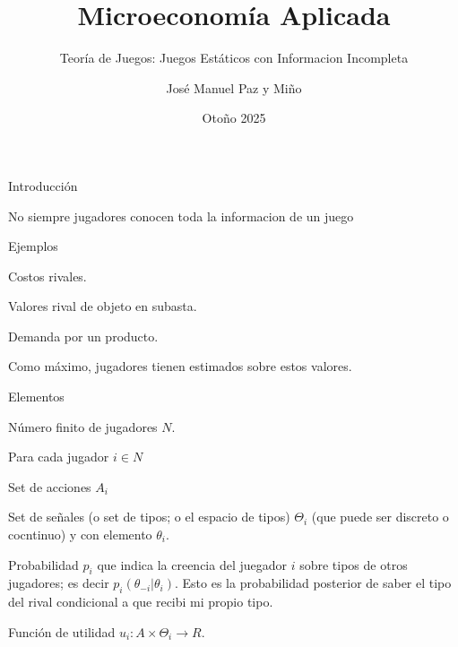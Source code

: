 \documentclass[notes, 11pt]{beamer} %
\newenvironment{wideitemize}{\itemize\addtolength{\itemsep}{10pt}}{\enditemize}
\begin{document}
\title{Microeconom\'ia Aplicada}   
\subtitle{Teor\'ia de Juegos: Juegos Est\'aticos con Informacion Incompleta}   
\author[Paz y Mino ]{Jos\'e Manuel Paz y Mi\~no}
\date{Oto\~no 2025} 

\frame{\titlepage} 

\begin{frame}{Introducci\'on}
	\begin{wideitemize}
		\item<1-> No siempre jugadores conocen toda la informacion de un juego
		\item<2-> Ejemplos
		\begin{wideitemize}
			\item<3->[--] Costos rivales.
			\item<4->[--] Valores rival de objeto en subasta.
			\item<5->[--] Demanda por un producto.
		\end{wideitemize}
		\item<6-> Como m\'aximo, jugadores tienen estimados sobre estos valores.

	\end{wideitemize}
\end{frame}


\begin{frame}{Elementos}
	\begin{wideitemize}
		\item<1-> N\'umero finito de jugadores $N$.
		\item<2-> Para cada jugador $i \in N$
		\begin{wideitemize}
			\item<3->[--] Set de acciones $A_{i}$
			\item<4->[--] Set de se\~nales (o set de tipos; o el espacio de tipos) $\Theta_{i}$ (que puede ser discreto o cocntinuo) y con elemento $\theta_i$.
			\item<5->[--] Probabilidad $p_{i}$ que indica la creencia del juegador $i$ sobre tipos de otros jugadores; es decir $p_{i}(\theta_{-i}|\theta_{i})$. Esto es la probabilidad posterior de saber el tipo del rival condicional a que recibi mi propio tipo.
			\item<6->[--] Funci\'on de utilidad $u_{i}: A \times \Theta_{i} \rightarrow R$.
		\end{wideitemize}
	\end{wideitemize}
\end{frame}
\end{document}

